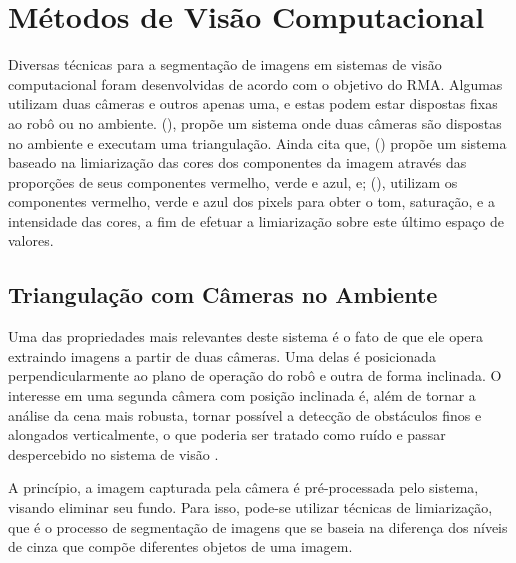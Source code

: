 \section{Métodos de Visão Computacional}
\label{sec:openCV}

Diversas técnicas para a segmentação de imagens em sistemas de visão computacional foram desenvolvidas de acordo com o objetivo do RMA. Algumas utilizam duas câmeras e outros apenas uma, e estas podem estar dispostas fixas ao robô ou no ambiente. \citeauthor{andrade2006sistema} (\citeyear{andrade2006sistema}), propõe um sistema onde duas câmeras são dispostas no ambiente e executam uma triangulação. Ainda cita que, \citeauthor{souza2003desenvolvimento} (\citeyear{souza2003desenvolvimento}) propõe um sistema baseado na limiarização das cores dos componentes da imagem através das proporções de seus componentes vermelho, verde e azul, e; \citeauthor{penharbel2004filtro} (\citeyear{penharbel2004filtro}), utilizam os componentes vermelho, verde e azul dos pixels para obter o tom, saturação, e a intensidade das cores, a fim de efetuar a limiarização sobre este último espaço de valores.

\subsection{Triangulação com Câmeras no Ambiente}
\label{subsec:triangulacao}

Uma das propriedades mais relevantes deste sistema é o fato de que ele opera extraindo imagens a partir de duas câmeras. Uma delas é posicionada perpendicularmente ao plano de operação do robô e outra de forma inclinada. O interesse em uma segunda câmera com posição inclinada é, além de tornar a análise da cena mais robusta, tornar possível a detecção de obstáculos finos e alongados verticalmente, o que poderia ser tratado como ruído e passar despercebido no sistema de visão \cite{andrade2006sistema}.

A princípio, a imagem capturada pela câmera é pré-processada pelo sistema, visando eliminar seu fundo. Para isso, pode-se utilizar técnicas de limiarização, que é o processo de segmentação de imagens que se baseia na diferença dos níveis de cinza que compõe diferentes objetos de uma imagem.

